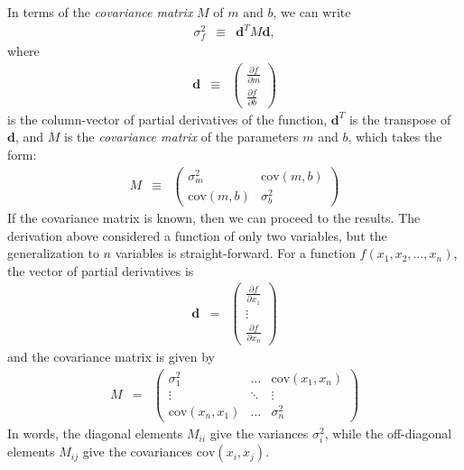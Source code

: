 \documentclass{article}
\begin{document}
In terms of the \emph{covariance matrix} $M$ of $m$ and $b$, we can write 
\begin{eqnarray}
  \sigma_f^2 &\equiv& \mathbf{d}^T M \mathbf{d},
\end{eqnarray}
where  
\begin{eqnarray}
  \mathbf{d} &\equiv& \left(\begin{array}{c} \frac{\partial f}{\partial m} \\ \frac{\partial f}{\partial b} \end{array} \right) 
\end{eqnarray}
is the column-vector of partial derivatives of the function, $\mathbf{d}^T$ is the transpose of $\mathbf{d}$, and $M$ is the \emph{covariance matrix} of the parameters $m$ and $b$, which takes the form:
\begin{eqnarray}
  M &\equiv & \left(\begin{array}{cc} \sigma_m^2 & \mbox{cov}(m,b) \\ \mbox{cov}(m,b) & \sigma_b^2 \end{array} \right)
\end{eqnarray}
If the covariance matrix is known, then we can proceed to the results. The derivation above considered a function of only two variables, but the generalization to $n$ variables is straight-forward. For a function $f(x_1, x_2, \ldots, x_n)$, the vector of partial derivatives is 
\begin{eqnarray}
  \mathbf{d} &=& \left(\begin{array}{c} \frac{\partial f}{\partial x_1} \\ \vdots \\ \frac{\partial f}{\partial x_n} \end{array}\right)
\end{eqnarray} 
and the covariance matrix is given by
\begin{eqnarray}
  M &=& \left(\begin{array}{ccc} \sigma_1^2 & \ldots & \mbox{cov}(x_1, x_n) \\ \vdots & \ddots & \vdots \\ \mbox{cov}(x_n, x_1) & \ldots & \sigma_n^2 \end{array}\right)
\end{eqnarray}
In words, the diagonal elements $M_{ii}$ give the variances $\sigma_i^2$, while the off-diagonal elements $M_{ij}$ give the covariances $\mbox{cov}(x_i, x_j)$.
\end{document}
